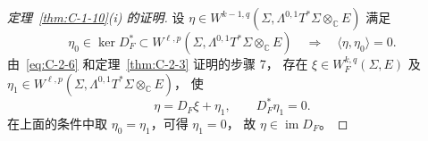 \begin{proof}[定理~\ref{thm:C-1-10}(i) 的证明]
设
$\eta\in W^{k-1,q}(\Sigma,\Lambda^{0,1}T^*\Sigma\otimes_{\mathbb C}E)$
满足
\[
  \eta_0\in\ker D_F^*
  \subset W^{\ell,p}(\Sigma,\Lambda^{0,1}T^*\Sigma\otimes_{\mathbb C}E)
  \quad\Longrightarrow\quad
  \langle\eta,\eta_0\rangle=0.
\]
由~\eqref{eq:C-2-6} 和定理~\ref{thm:C-2-3} 证明的步骤 7，
存在 $\xi\in W_F^{k,q}(\Sigma,E)$ 及
$\eta_1\in W^{\ell,p}(\Sigma,\Lambda^{0,1}T^*\Sigma\otimes_{\mathbb C}E)$，
使
\[
  \eta=D_F\xi+\eta_1,\qquad D_F^*\eta_1=0.
\]
在上面的条件中取 $\eta_0=\eta_1$，可得 $\eta_1=0$，
故 $\eta\in\operatorname{im}D_F$。
\end{proof}
